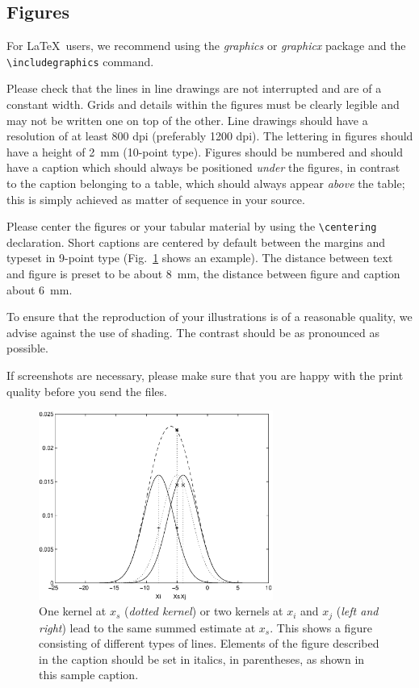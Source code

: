 \documentclass[runningheads,a4paper]{llncs}
\begin{document}
\subsection{Figures}

For \LaTeX\ users, we recommend using the \emph{graphics} or \emph{graphicx}
package and the \verb+\includegraphics+ command.

Please check that the lines in line drawings are not
interrupted and are of a constant width. Grids and details within the
figures must be clearly legible and may not be written one on top of
the other. Line drawings should have a resolution of at least 800 dpi
(preferably 1200 dpi). The lettering in figures should have a height of
2~mm (10-point type). Figures should be numbered and should have a
caption which should always be positioned \emph{under} the figures, in
contrast to the caption belonging to a table, which should always appear
\emph{above} the table; this is simply achieved as matter of sequence in
your source.

Please center the figures or your tabular material by using the \verb+\centering+
declaration. Short captions are centered by default between the margins
and typeset in 9-point type (Fig.~\ref{fig:example} shows an example).
The distance between text and figure is preset to be about 8~mm, the
distance between figure and caption about 6~mm.

To ensure that the reproduction of your illustrations is of a reasonable
quality, we advise against the use of shading. The contrast should be as
pronounced as possible.

If screenshots are necessary, please make sure that you are happy with
the print quality before you send the files.
\begin{figure}
\centering
\includegraphics[height=6.2cm]{eijkel2}
\caption{One kernel at $x_s$ (\emph{dotted kernel}) or two kernels at
$x_i$ and $x_j$ (\textit{left and right}) lead to the same summed estimate
at $x_s$. This shows a figure consisting of different types of
lines. Elements of the figure described in the caption should be set in
italics, in parentheses, as shown in this sample caption.}
\label{fig:example}
\end{figure}
\end{document}
